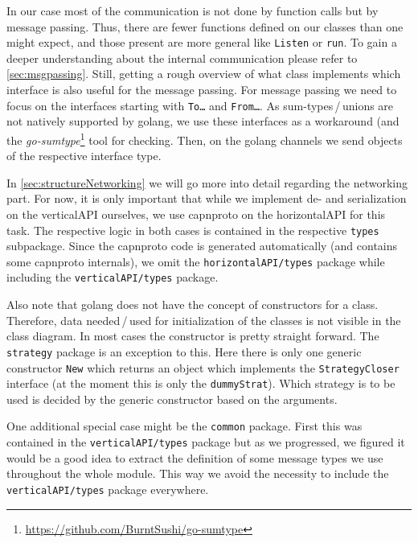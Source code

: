 \documentclass[a4paper,english,10pt,NET]{tumarticle}
\begin{document}
In our case most of the communication is not done by function calls but by message passing.
Thus, there are fewer functions defined on our classes than one might expect, and those present are more general like \texttt{Listen} or \texttt{run}.
To gain a deeper understanding about the internal communication please refer to \cref{sec:msgpassing}.
Still, getting a rough overview of what class implements which interface is also useful for the message passing.
For message passing we need to focus on the interfaces starting with \texttt{To\ldots} and \texttt{From\ldots}.
As sum-types\,/\,unions are not natively supported by golang, we use these interfaces as a workaround (and the \emph{go-sumtype}\footnote{\url{https://github.com/BurntSushi/go-sumtype}} tool for checking.
Then, on the golang channels we send objects of the respective interface type.

In \cref{sec:structureNetworking} we will go more into detail regarding the networking part.
For now, it is only important that while we implement de- and serialization on the verticalAPI ourselves, we use capnproto on the horizontalAPI for this task.
The respective logic in both cases is contained in the respective \texttt{types} subpackage.
Since the capnproto code is generated automatically (and contains some capnproto internals), we omit the \texttt{horizontalAPI/types} package while including the \texttt{verticalAPI/types} package.

Also note that golang does not have the concept of constructors for a class.
Therefore, data needed\,/\,used for initialization of the classes is not visible in the class diagram.
In most cases the constructor is pretty straight forward.
The \texttt{strategy} package is an exception to this.
Here there is only one generic constructor \texttt{New} which returns an object which implements the \texttt{StrategyCloser} interface (at the moment this is only the \texttt{dummyStrat}).
Which strategy is to be used is decided by the generic constructor based on the arguments.

One additional special case might be the \texttt{common} package.
First this was contained in the \texttt{verticalAPI/types} package but as we progressed, we figured it would be a good idea to extract the definition of some message types we use throughout the whole module.
This way we avoid the necessity to include the \texttt{verticalAPI/types} package everywhere.
\end{document}
